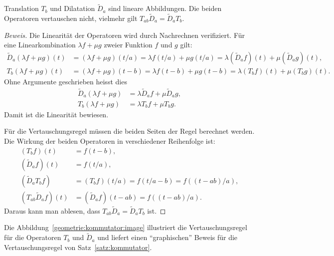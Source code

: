 \begin{satz}
\label{satz:kommutator}
Translation $T_b$ und Dilatation $\tilde{D}_a$ sind lineare Abbildungen.
Die beiden Operatoren vertauschen nicht, vielmehr gilt
$T_{ab}\tilde{D}_a = \tilde{D}_aT_b$.
\end{satz}
%

\begin{proof}[Beweis]
Die Linearität der Operatoren wird durch Nachrechnen verifiziert.
Für eine Linearkombination $\lambda f+\mu g$ zweier Funktion $f$ und $g$ gilt:
\begin{align*}
\tilde{D}_a(\lambda f+\mu g)(t)
&=
(\lambda f+\mu g)(t/a)
=
\lambda f(t/a)+\mu g(t/a)
=
\lambda (\tilde{D}_af)(t)+\mu (\tilde{D}_ag)(t),
\\
T_b(\lambda f+ \mu g)(t)
&=
(\lambda f+\mu g)(t-b)
=
\lambda f(t-b)+\mu g(t-b)
=
\lambda (T_bf)(t)+\mu (T_bg)(t).
\end{align*}
Ohne Argumente geschrieben heisst dies
\begin{align*}
\tilde{D}_a(\lambda f+\mu g) &= \lambda \tilde{D}_af + \mu \tilde{D}_ag,
\\
T_b(\lambda f+\mu g) &= \lambda T_bf + \mu T_bg.
\end{align*}
Damit ist die Linearität bewiesen.

Für die Vertauschungsregel müssen die beiden Seiten der Regel
berechnet werden.
Die Wirkung der beiden Operatoren in verschiedener Reihenfolge
ist:
\begin{align*}
(T_bf)(t)
&=
f(t-b),
\\
(\tilde{D}_af)(t)
&=
f(t/a),
\\
(\tilde{D}_aT_bf)
&=
(T_bf)(t/a)
=
f(t/a-b)
=
f((t-ab)/a),
\\
(T_{ab}\tilde{D}_a f)(t)
&=
(\tilde{D}_af)(t - ab)
=
f((t-ab)/a).
\end{align*}
Daraus kann man ablesen, dass $T_{ab}\tilde{D}_a=\tilde{D}_aT_b$ ist.
\end{proof}

Die Abbildung~\ref{geometrie:kommutator:image} illustriert die
Vertauschungsregel für die Operatoren $T_b$ und $\tilde{D}_a$ und liefert
einen ``graphischen'' Beweis für die Vertauschungsregel von
Satz~\ref{satz:kommutator}.

